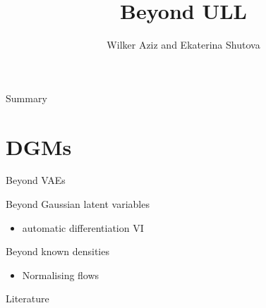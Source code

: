 \documentclass[usenames,dvipsnames]{beamer}
\title{Beyond ULL}
\author{Wilker Aziz and Ekaterina Shutova}
\begin{document}
\maketitlepage


\setcounter{framenumber}{0}


\begin{frame}{Summary}

\end{frame}

\section{DGMs}


\begin{frame}{Beyond VAEs}

Beyond Gaussian latent variables
\begin{itemize}
	\item automatic differentiation VI \citep{KucukelbirEtAl:2017}
\end{itemize}

Beyond known densities
\begin{itemize}
	\item Normalising flows \citep{RezendeEtAlNF,kingma2016improved}
\end{itemize}

\end{frame}


\begin{frame}[allowframebreaks]{Literature}

\small

\end{frame}
\end{document}
